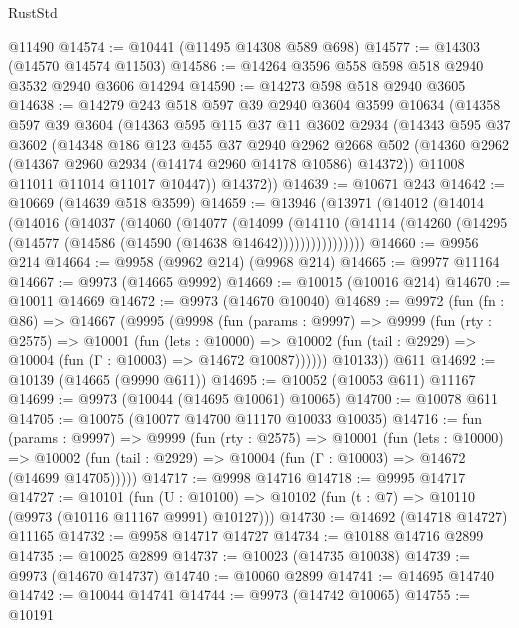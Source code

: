 \begin{lexlean}{RustStd}
\begin{coremodule}
    @11490
@14574 := @10441 (@11495 @14308 @589 @698)
@14577 := @14303 (@14570 @14574 @11503)
@14586 := @14264 @3596 @558 @598 @518 @2940 @3532 @2940 @3606 @14294
@14590 := @14273 @598 @518 @2940 @3605
@14638 := @14279
    @243
    @518
    @597
    @39
    @2940
    @3604
    @3599
    @10634
    (@14358
      @597
      @39
      @3604
      (@14363
        @595
        @115
        @37
        @11
        @3602
        @2934
        (@14343
          @595
          @37
          @3602
          (@14348
            @186
            @123
            @455
            @37
            @2940
            @2962
            @2668
            @502
            (@14360 @2962 (@14367 @2960 @2934 (@14174 @2960 @14178 @10586) @14372))
            @11008
            @11011
            @11014
            @11017
            @10447))
        @14372))
@14639 := @10671 @243
@14642 := @10669 (@14639 @518 @3599)
@14659 := @13946
    (@13971
      (@14012
        (@14014
          (@14016
            (@14037
              (@14060
                (@14077
                  (@14099
                    (@14110
                      (@14114 (@14260 (@14295 (@14577 (@14586 (@14590 (@14638 @14642))))))))))))))))
@14660 := @9956 @214
@14664 := @9958 (@9962 @214) (@9968 @214)
@14665 := @9977 @11164
@14667 := @9973 (@14665 @9992)
@14669 := @10015 (@10016 @214)
@14670 := @10011 @14669
@14672 := @9973 (@14670 @10040)
@14689 := @9972
    (fun (fn : @86) =>
    @14667
      (@9995
        (@9998
          (fun (params : @9997) =>
          @9999
            (fun (rty : @2575) =>
            @10001
              (fun (lets : @10000) =>
              @10002 (fun (tail : @2929) => @10004 (fun (Γ : @10003) => @14672 @10087))))))
        @10133))
    @611
@14692 := @10139 (@14665 (@9990 @611))
@14695 := @10052 (@10053 @611) @11167
@14699 := @9973 (@10044 (@14695 @10061) @10065)
@14700 := @10078 @611
@14705 := @10075 (@10077 @14700 @11170 @10033 @10035)
@14716 := fun (params : @9997) =>
  @9999
    (fun (rty : @2575) =>
    @10001
      (fun (lets : @10000) =>
      @10002 (fun (tail : @2929) => @10004 (fun (Γ : @10003) => @14672 (@14699 @14705)))))
@14717 := @9998 @14716
@14718 := @9995 @14717
@14727 := @10101
    (fun (U : @10100) => @10102 (fun (t : @7) => @10110 (@9973 (@10116 @11167 @9991) @10127)))
@14730 := @14692 (@14718 @14727) @11165
@14732 := @9958 @14717 @14727
@14734 := @10188 @14716 @2899
@14735 := @10025 @2899
@14737 := @10023 (@14735 @10038)
@14739 := @9973 (@14670 @14737)
@14740 := @10060 @2899
@14741 := @14695 @14740
@14742 := @10044 @14741
@14744 := @9973 (@14742 @10065)
@14755 := @10191

\end{coremodule}
\end{lexlean}
